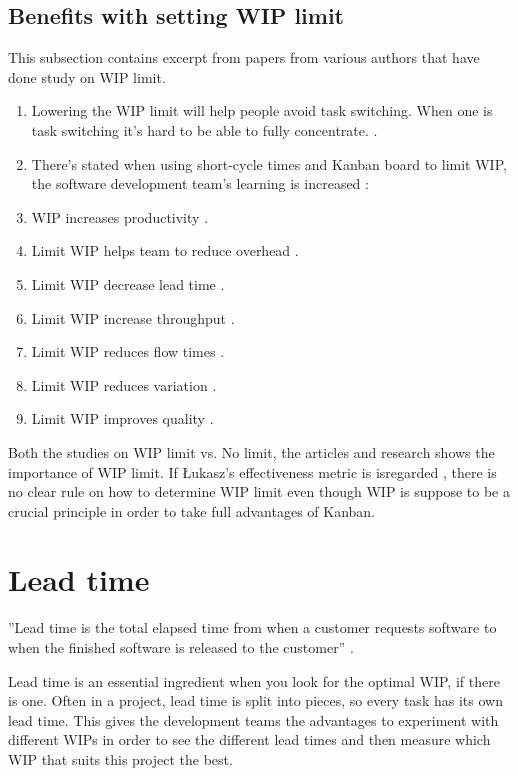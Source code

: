 \documentclass[UKenglish]{ifimaster}  %
\begin{document}
\subsection{Benefits with setting WIP limit}
\label{sub:sub:benefits}
This subsection contains excerpt from papers from various authors that have done study on WIP limit. 

\begin{enumerate}
\item Lowering the WIP limit will help people avoid task switching. When one is task switching it's hard to be able to fully concentrate. \parencite{Ikonen}.
\item There's stated when using short-cycle times and Kanban board to limit WIP, the software development team's learning is increased \parencite{Joyce}:
\item WIP increases productivity \parencite{Joyce}.
\item Limit WIP helps team to reduce overhead \parencite {CONWIP}.
\item Limit WIP decrease lead time \parencite {CONWIP}.
\item Limit WIP increase throughput \parencite {CONWIP}.
\item Limit WIP reduces flow times \parencite {CONWIP}.
\item Limit WIP reduces variation \parencite {CONWIP}.
\item Limit WIP improves quality \parencite {CONWIP}.
\end{enumerate}

Both the studies on WIP limit vs. No limit, the articles and research shows the importance of WIP limit. If  \L ukasz's effectiveness metric is isregarded , there is no clear rule on how to determine WIP limit even though WIP is suppose to be a crucial principle in order to take full advantages of Kanban.

\section {Lead time}
''Lead time is the total elapsed time from when a customer requests software to when the finished software is released to the customer'' \parencite{Joyce}.

Lead time is an essential ingredient when you look for the optimal WIP, if there is one. Often in a project, lead time is split into pieces, so every task has its own lead time. This gives the development teams the advantages to experiment with different WIPs in order to see the different lead times and then measure which WIP that suits this project the best. 
\end{document}
